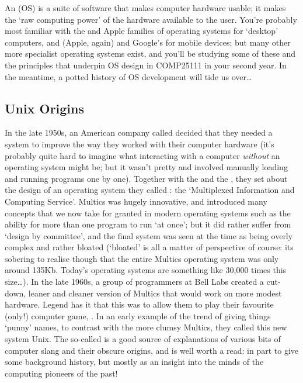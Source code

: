 An  (OS) is a suite of
software that makes computer hardware usable; it makes the `raw
computing power' of the hardware available to the user. You're
probably most familiar with
the  and
Apple  families of operating systems for
`desktop' computers, and  (Apple, again) and
Google's  for mobile
devices; but many other more specialist operating systems exist, and
you'll be studying some of these and the principles that underpin OS
design in COMP25111 in your second year. In the meantime, a potted
history of OS development will tide us over\ldots

\subsection{Unix Origins}
\label{sec:unix}

In the late 1950s, an American company
called  decided that they
needed a system to improve the way they worked with their computer
hardware (it's probably quite hard to imagine what interacting with a
computer \emph{without} an operating system might be; but it wasn't
pretty and involved manually loading and running programs one by
one). Together with the  and the , they set about the design of an operating system they
called : the `Multiplexed Information and
Computing Service'. Multics was hugely innovative, and introduced many
concepts that we now take for granted in modern operating systems such
as the ability for more than one program to run `at once'; but it did
rather suffer from `design by committee', and the final system was
seen at the time as being overly complex and rather bloated (`bloated'
is all a matter of perspective of course: its sobering to realise
though that the entire Multics operating system was only around
135Kb. Today's operating systems are something like 30,000 times this
size\ldots). In the late 1960s, a group of programmers at Bell Labs
created a cut-down, leaner and cleaner version of Multics that would
work on more modest hardware. Legend has it that this was to allow
them to play their favourite (only!) computer
game, . In an early
example of the trend of giving things `punny' names, to contrast with
the more clumsy Multics, they called this new system Unix. The
so-called  is a good source of
explanations of various bits of computer slang and their obscure
origins, and is well worth a read: in part to give some background
history, but mostly as an insight into the minds of the computing
pioneers of the past!


